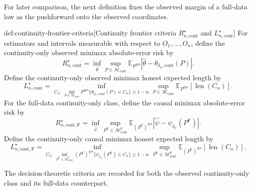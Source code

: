 \documentclass[11pt]{article}
\begin{document}
For later comparison, the next definition fixes the observed margin of a full-data law as the pushforward onto the observed coordinates.

\begin{definitionv}{def:continuity-frontier-criteria}[Continuity frontier criteria \(R_{n,\mathrm{cont}}^\star\) and \(L_{n,\mathrm{cont}}^\star\)]
For estimators and intervals measurable with respect to \(O_1,\ldots,O_n\), define the continuity-only observed minimax absolute-error risk by
\[
R_{n,\mathrm{cont}}^\star
=
\inf_{\widehat\theta}\sup_{P\in\mathcal M_{\mathrm{cont}}}
\mathbb E_{P^{\otimes n}}
\left|\widehat\theta-\theta_{\delta_n,\mathrm{cont}}(P)\right|.
\]
Define the continuity-only observed minimax honest expected length by
\[
L_{n,\mathrm{cont}}^\star
=
\inf_{C_n:\,\inf_{P\in\mathcal M_{\mathrm{cont}}}P^{\otimes n}
\{\theta_{\delta_n,\mathrm{cont}}(P)\in C_n\}\geq1-\alpha}
\sup_{P\in\mathcal M_{\mathrm{cont}}}
\mathbb E_{P^{\otimes n}}\!\left[\operatorname{len}(C_n)\right].
\]
For the full-data continuity-only class, define the causal minimax absolute-error risk by
\[
R_{n,\mathrm{cont},\mathrm F}^\star
=
\inf_{\widehat\psi}\sup_{P^{\mathrm F}\in\mathcal M_{\mathrm{cont}}^{\mathrm F}}
\mathbb E_{(P^{\mathrm F})^{\otimes n}}
\left|\widehat\psi-\psi_{\delta_n}(P^{\mathrm F})\right|.
\]
Define the continuity-only causal minimax honest expected length by
\[
L_{n,\mathrm{cont},\mathrm F}^\star
=
\inf_{C_n:\,\inf_{P^{\mathrm F}\in\mathcal M_{\mathrm{cont}}^{\mathrm F}}
(P^{\mathrm F})^{\otimes n}\{\psi_{\delta_n}(P^{\mathrm F})\in C_n\}\geq1-\alpha}
\sup_{P^{\mathrm F}\in\mathcal M_{\mathrm{cont}}^{\mathrm F}}
\mathbb E_{(P^{\mathrm F})^{\otimes n}}\!\left[\operatorname{len}(C_n)\right].
\]
\end{definitionv}

The decision-theoretic criteria are recorded for both the observed continuity-only class and its full-data counterpart.
\end{document}
